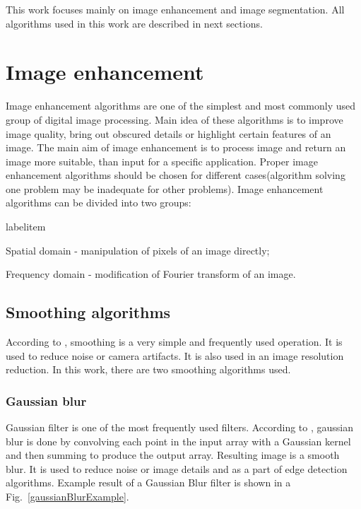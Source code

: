 \documentclass[a4paper,onecolumn,oneside,12pt]{memoir}
\makeatletter
\renewenvironment{itemize}{
  \begin{list}{  
  \csname labelitem\romannumeral\the\@listdepth\endcsname}{
  \setlength{\leftmargin}{1em}
	\setlength{\topsep}{6pt}%
	\setlength{\partopsep}{0pt}%
	\setlength{\parskip}{0pt}%
	\setlength{\parsep}{0pt}%
	\setlength{\itemsep}{0pt}}
}{
  \end{list}
}
\makeatother
\begin{document}
This work focuses mainly on image enhancement and image segmentation. All algorithms used in this 
work are described in next sections.

\section{Image enhancement}

Image enhancement algorithms are one of the simplest and most commonly used group of digital image
processing. Main idea of these algorithms is to improve image quality, bring out obscured details 
or highlight certain features of an image.  The main aim of image enhancement is to process image 
and return an image more suitable, than input for a specific application. Proper image enhancement
algorithms should be chosen for different cases(algorithm solving one problem may be inadequate for
other problems). Image enhancement algorithms can be divided into two groups:

\begin{itemize}
  \item Spatial domain - manipulation of pixels of an image directly;
  \item Frequency domain - modification of Fourier transform of an image.
\end{itemize}

\subsection{Smoothing algorithms}

According to \cite{learningOpenCv}, smoothing is a very simple and frequently used operation. It is
used to reduce noise or camera artifacts. It is also used in an image resolution reduction. In this
work, there are two smoothing algorithms used.

\subsubsection{Gaussian blur}

Gaussian filter is one of the most frequently used filters. According to \cite{learningOpenCv}, 
gaussian blur is done by convolving each point in the input array with a Gaussian kernel and then
summing to produce the output array. Resulting image is a smooth blur. It is used to reduce noise
or image details and as a part of edge detection algorithms. Example result of a Gaussian Blur
filter is shown in a Fig.~\ref{gaussianBlurExample}.
\end{document}
